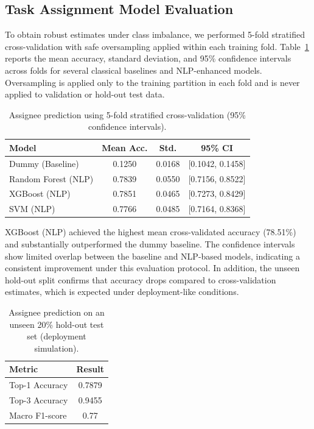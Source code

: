\documentclass[conference]{IEEEtran}
\begin{document}
\subsection{Task Assignment Model Evaluation}

To obtain robust estimates under class imbalance, we performed 5-fold stratified cross-validation with safe oversampling applied within each training fold. Table~\ref{tab:cls_cv} reports the mean accuracy, standard deviation, and 95\% confidence intervals across folds for several classical baselines and NLP-enhanced models. Oversampling is applied only to the training partition in each fold and is never applied to validation or hold-out test data.

\begin{table}[t]
\centering
\caption{Assignee prediction using 5-fold stratified cross-validation (95\% confidence intervals).}
\renewcommand{\arraystretch}{1.1}
\begin{tabular}{l c c c}
\hline
\textbf{Model} & \textbf{Mean Acc.} & \textbf{Std.} & \textbf{95\% CI} \\
\hline
Dummy (Baseline)        & 0.1250 & 0.0168 & [0.1042, 0.1458] \\
Random Forest (NLP)     & 0.7839 & 0.0550 & [0.7156, 0.8522] \\
XGBoost (NLP)           & 0.7851 & 0.0465 & [0.7273, 0.8429] \\
SVM (NLP)               & 0.7766 & 0.0485 & [0.7164, 0.8368] \\
\hline
\end{tabular}
\label{tab:cls_cv}
\end{table}


XGBoost (NLP) achieved the highest mean cross-validated accuracy (78.51\%) and substantially outperformed the dummy baseline. The confidence intervals show limited overlap between the baseline and NLP-based models, indicating a consistent improvement under this evaluation protocol. In addition, the unseen hold-out split confirms that accuracy drops compared to cross-validation estimates, which is expected under deployment-like conditions.

\begin{table}[t]
\centering
\caption{Assignee prediction on an unseen 20\% hold-out test set (deployment simulation).}
\renewcommand{\arraystretch}{1.05}
\begin{tabular}{l c}
\hline
\textbf{Metric} & \textbf{Result} \\
\hline
Top-1 Accuracy & 0.7879 \\
Top-3 Accuracy & 0.9455 \\
Macro F1-score & 0.77 \\
\hline
\end{tabular}
\label{tab:assignee_holdout}
\end{table}
\end{document}
